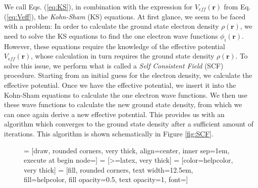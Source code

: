 \begin{refsection}
We call Eqs. (\ref{eq:KS}), in combination with the expression for $V_{eff}(\mathbf{r})$ from Eq. (\ref{eq:Veff}), the \textit{Kohn-Sham} (KS) equations. At first glance, we seem to be faced with a problem: In order to calculate the ground state electron density $\rho(\mathbf{r})$, we need to solve the KS equations to find the one electron wave functions $\phi_i(\mathbf{r})$. However, these equations require the knowledge of the effective potential $V_{eff}(\mathbf{r})$, whose calculation in turn requires the ground state density $\rho(\mathbf{r})$. To solve this issue, we perform what is called a \textit{Self Consistent Field} (SCF) procedure. Starting from an initial guess for the electron density, we calculate the effective potential. Once we have the effective potential, we insert it into the Kohn-Sham equations to calculate the one electron wave functions. We then use these wave functions to calculate the new ground state density, from which we can once again derive a new effective potential. This provides us with an algorithm which converges to the ground state density after a sufficient amount of iterations. This algorithm is shown schematically in Figure \ref{fig:SCF}. 

\begin{figure}[!h] 
\centering




 = [draw, rounded corners, very thick, align=center, inner sep=1em, execute at begin node=\setlength{\baselineskip}{2em}]
 = [>=latex, very thick]
 = [color=helpcolor, very thick]
 = [fill, rounded corners, text width=12.5em, fill=helpcolor, fill opacity=0.5, text opacity=1, font=\small]


\end{figure}
\end{refsection}

